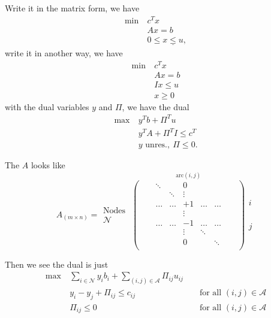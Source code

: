 \begin{answer}
	Write it in the matrix form, we have
	\begin{align*}
		\min~ & c^Tx                       \\
		      & Ax = b                     \\
		      & 0\leq \underline{x\leq u},
	\end{align*}
	write it in another way, we have
	\begin{align*}
		\min~ & c^Tx     \\
		      & Ax = b   \\
		      & Ix\leq u \\
		      & x\geq 0
	\end{align*}
	with the dual variables \(y\) and \(\Pi\), we have the dual
	\begin{align*}
		\max~ & y^{T}b + \Pi^{T}u            \\
		      & y^{T}A+\Pi^{T}I\leq c^{T}    \\
		      & y\text{ unres.},\ \Pi\leq 0.
	\end{align*}

	The \(A\) looks like
	\[
		A_{(m\times n)} = \substack{\text{Nodes }\\\mathcal{N}}\overset{\mathrm{arc}(i, j)}{
			\begin{pmatrix}
				 &  & \ddots &        & 0      &        &        &  & \\
				 &  &        & \ddots & \vdots &        &        &  & \\
				 &  & \ldots & \ldots & +1     & \ldots & \ldots &  & \\
				 &  &        &        & \vdots &        &        &  & \\
				 &  & \ldots & \ldots & -1     & \ldots & \ldots &  & \\
				 &  &        &        & \vdots & \ddots &        &  & \\
				 &  &        &        & 0      &        & \ddots &  & \\
			\end{pmatrix}}\substack{i\\ \\ \\ \\ \\ j}
	\]

	Then we see the dual is just
	\[
		\begin{alignedat}{3}
			\max~ & \sum\limits_{i\in\mathcal{N}}y_{i}b_{i}+\sum\limits_{(i, j)\in\mathcal{A}} \Pi_{ij}u_{ij}                                        \\
			& y_{i} - y_{j}+\Pi_{ij}\leq c_{ij}                                                         && \text{ for all }(i, j)\in\mathcal{A} \\
			& \Pi_{ij}\leq 0                                                                            && \text{ for all }(i, j)\in\mathcal{A}
		\end{alignedat}
	\]
\end{answer}